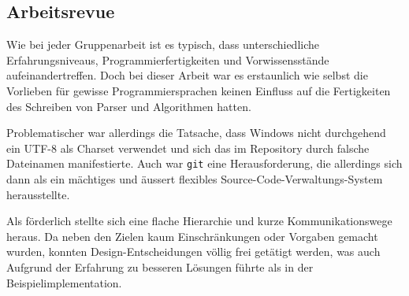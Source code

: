 \subsection{Arbeitsrevue}
Wie bei jeder Gruppenarbeit ist es typisch, dass unterschiedliche
Erfahrungsniveaus, Programmierfertigkeiten und Vorwissensstände
aufeinandertreffen. Doch bei dieser Arbeit war es erstaunlich wie selbst die
Vorlieben für gewisse Programmiersprachen keinen Einfluss auf die Fertigkeiten
des Schreiben von Parser und Algorithmen hatten.

Problematischer war allerdings die Tatsache, dass Windows nicht durchgehend
ein UTF-8 als Charset verwendet und sich das im Repository durch falsche
Dateinamen manifestierte. Auch war \texttt{git} eine Herausforderung, die
allerdings sich dann als ein mächtiges und äussert flexibles
Source-Code-Verwaltungs-System herausstellte.

Als förderlich stellte sich eine flache Hierarchie und kurze
Kommunikationswege heraus. Da neben den Zielen kaum Einschränkungen oder
Vorgaben gemacht wurden, konnten Design-Entscheidungen völlig frei getätigt
werden, was auch Aufgrund der Erfahrung zu besseren Lösungen führte als in der
Beispielimplementation.
